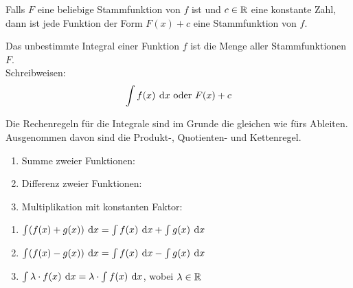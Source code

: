 \documentclass[11pt,oneside]{article}
\begin{document}
	\begin{satz}
		Falls $F$ eine beliebige Stammfunktion von $f$ ist und $c\in\mathbb{R}$ eine konstante Zahl, dann ist jede Funktion der Form $F(x)+c$ eine Stammfunktion von $f$.
	\end{satz}
	\begin{notation}
		Das unbestimmte Integral einer Funktion $f$ ist die Menge aller Stammfunktionen $F$.\\ Schreibweisen:
		\[\int f(x)\:\operatorname{d}\!{x} \text{ oder } F(x)+c\]
	\end{notation}
	Die Rechenregeln für die Integrale sind im Grunde die gleichen wie fürs Ableiten. Ausgenommen davon sind die Produkt-, Quotienten- und Kettenregel.
	\begin{satz}[Rechenregeln]
		\begin{minipage}{0.4\linewidth}
			\begin{enumerate}
				\item Summe zweier Funktionen:
				\item Differenz zweier Funktionen:
				\item Multiplikation mit konstanten Faktor:
			\end{enumerate}
		\end{minipage}
		\hfill
		\begin{minipage}{0.55\linewidth}
			\begin{enumerate}[label=\ ]
				\item $\int(f(x)+g(x))\:\operatorname{d}\!{x}=\int f(x)\:\operatorname{d}\!{x}+\int g(x)\:\operatorname{d}\!{x}$
				\item $\int(f(x)-g(x))\:\operatorname{d}\!{x}=\int f(x)\:\operatorname{d}\!{x}-\int g(x)\:\operatorname{d}\!{x}$
				\item $\int\lambda\cdot f(x)\:\operatorname{d}\!{x}=\lambda\cdot\int f(x)\:\operatorname{d}\!{x}$, wobei $\lambda\in\mathbb{R}$
			\end{enumerate}
		\end{minipage}
	\end{satz}
\end{document}
